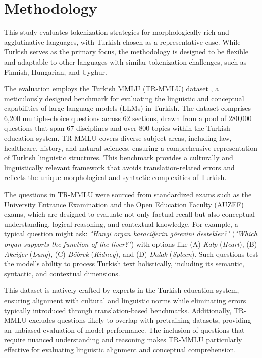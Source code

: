 \section{Methodology}

This study evaluates tokenization strategies for morphologically rich and agglutinative languages, with Turkish chosen as a representative case. While Turkish serves as the primary focus, the methodology is designed to be flexible and adaptable to other languages with similar tokenization challenges, such as Finnish, Hungarian, and Uyghur.

The evaluation employs the Turkish MMLU (TR-MMLU) dataset \cite{bayram_setting_2025}, a meticulously designed benchmark for evaluating the linguistic and conceptual capabilities of large language models (LLMs) in Turkish. The dataset comprises 6,200 multiple-choice questions across 62 sections, drawn from a pool of 280,000 questions that span 67 disciplines and over 800 topics within the Turkish education system. TR-MMLU covers diverse subject areas, including law, healthcare, history, and natural sciences, ensuring a comprehensive representation of Turkish linguistic structures. This benchmark provides a culturally and linguistically relevant framework that avoids translation-related errors and reflects the unique morphological and syntactic complexities of Turkish.

The questions in TR-MMLU were sourced from standardized exams such as the University Entrance Examination and the Open Education Faculty (AUZEF) exams, which are designed to evaluate not only factual recall but also conceptual understanding, logical reasoning, and contextual knowledge. For example, a typical question might ask: \textit{"Hangi organ karaciğerin görevini destekler?"} (\textit{"Which organ supports the function of the liver?"}) with options like (A) \textit{Kalp} (\textit{Heart}), (B) \textit{Akciğer} (\textit{Lung}), (C) \textit{Böbrek} (\textit{Kidney}), and (D) \textit{Dalak} (\textit{Spleen}). Such questions test the model's ability to process Turkish text holistically, including its semantic, syntactic, and contextual dimensions.

This dataset is natively crafted by experts in the Turkish education system, ensuring alignment with cultural and linguistic norms while eliminating errors typically introduced through translation-based benchmarks. Additionally, TR-MMLU excludes questions likely to overlap with pretraining datasets, providing an unbiased evaluation of model performance. The inclusion of questions that require nuanced understanding and reasoning makes TR-MMLU particularly effective for evaluating linguistic alignment and conceptual comprehension.

